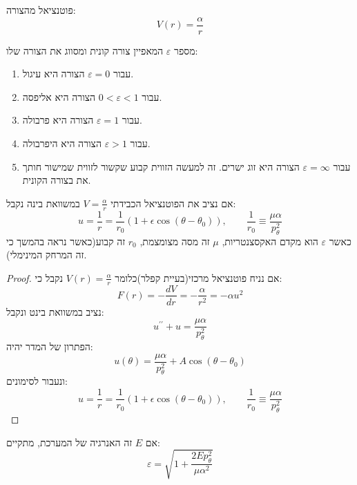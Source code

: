 \documentclass{tstextbook}
\begin{document}
\begin{definition}
פוטנציאל מהצורה:
$$V(r)=\frac{\alpha}{r}$$

\end{definition}
\begin{definition}
מספר \(\varepsilon\) המאפיין צורה קונית ומסווג את הצורה שלו:

  \begin{enumerate}
    \item עבור \(\varepsilon=0\) הצורה היא עיגול. 


    \item עבור \(0<\varepsilon<1\) הצורה היא אליפסה. 


    \item עבור \(\varepsilon=1\) הצורה היא פרבולה. 


    \item עבור \(\varepsilon>1\) הצורה היא היפרבולה. 


    \item עבור \(\varepsilon=\infty\) הצורה היא זוג ישרים. 
זה למעשה הזווית קבוע שקשור לזווית שמישור חותך את בצורה הקונית.


  \end{enumerate}
\end{definition}
\begin{proposition}
אם נציב את הפוטנציאל הכבידתי \(V=\frac{\alpha}{r}\) במשוואת בינה נקבל:
$$ u=\frac1r=\frac1{r_0}(1+\epsilon\cos(\theta-\theta_0)),\quad\quad\frac1{r_0}\equiv\frac{\mu\alpha}{p_\theta^2}$$
כאשר \(\varepsilon\) הוא מקדם האקסצנטריות, \(\mu\) זה מסה מצומצמת, \(r_{0}\) זה קבוע(כאשר נראה בהמשך כי זה המרחק המינימלי).

\end{proposition}
\begin{proof}
אם נניח פוטנציאל מרכזי(בעיית קפלר)כלומר \(V(r)=\frac{\alpha}{r}\) נקבל כי:
$$ F(r)=-\frac{dV}{dr}=-\frac\alpha{r^2}=-\alpha u^2$$
נציב במשוואת בינט ונקבל:
$$ u^{\prime\prime}+u=\frac{\mu\alpha}{p_\theta^2}$$
הפתרון של המדר יהיה:
$$ u(\theta)=\frac{\mu\alpha}{p_\theta^2}+A\cos(\theta-\theta_0)$$
ונעבור לסימונים:
$$ u=\frac1r=\frac1{r_0}(1+\epsilon\cos(\theta-\theta_0)),\quad\quad\frac1{r_0}\equiv\frac{\mu\alpha}{p_\theta^2}$$

\end{proof}
\begin{proposition}
אם \(E\) זה האנרגיה של המערכת, מתקיים:
$$\varepsilon=\sqrt{ 1+ \frac{2Ep_{\theta}^{2}}{\mu \alpha^{2}} }$$

\end{proposition}
\end{document}
